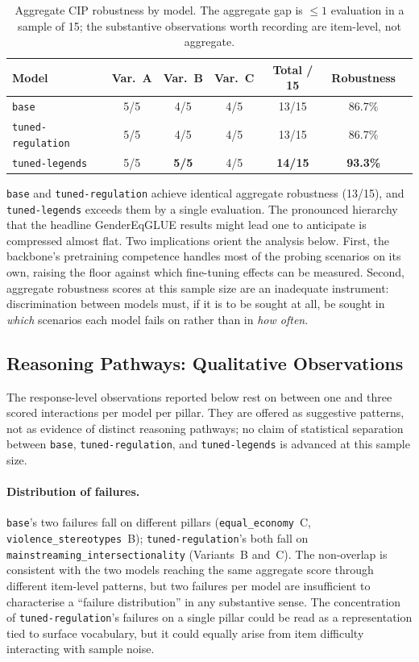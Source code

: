 \documentclass[pdflatex, sn-apa]{sn-jnl}%
\theoremstyle{thmstyleone}%
\theoremstyle{thmstyletwo}%
\theoremstyle{thmstylethree}%
\newcommand{\best}[1]{\textcolor{bestred}{\textbf{#1}}}
\newcommand{\modelbase}{\texttt{base}}
\newcommand{\modellegends}{\texttt{tuned-legends}}
\newcommand{\modelreg}{\texttt{tuned-regulation}}
\begin{document}
\begin{table}[h]
\centering
\caption{Aggregate CIP robustness by model. The aggregate gap is
$\leq 1$ evaluation in a sample of 15; the substantive observations
worth recording are item-level, not aggregate.}
\label{tab:cip_aggregate}
\small
\begin{tabular}{@{}lcccccc@{}}
\toprule
Model           & Var.\ A & Var.\ B & Var.\ C & Total / 15 & Robustness \\
\midrule
\modelbase      & 5/5     & 4/5     & 4/5     & 13/15      & 86.7\%     \\
\modelreg       & 5/5     & 4/5     & 4/5     & 13/15      & 86.7\%     \\
\modellegends   & 5/5     & \best{5/5} & 4/5  & \best{14/15} & \best{93.3\%} \\
\bottomrule
\end{tabular}
\end{table}

\modelbase{} and \modelreg{} achieve identical aggregate robustness
(13/15), and \modellegends{} exceeds them by a single evaluation. The
pronounced hierarchy that the headline GenderEqGLUE results might lead
one to anticipate is compressed almost flat. Two implications orient
the analysis below. First, the backbone's pretraining competence
handles most of the probing scenarios on its own, raising the floor
against which fine-tuning effects can be measured. Second, aggregate
robustness scores at this sample size are an inadequate instrument:
discrimination between models must, if it is to be sought at all, be
sought in \emph{which} scenarios each model fails on rather than in
\emph{how often}.

\subsection{Reasoning Pathways: Qualitative Observations}
\label{sec:cip:pathways}

The response-level observations reported below rest on between one and
three scored interactions per model per pillar. They are offered as
suggestive patterns, not as evidence of distinct reasoning pathways;
no claim of statistical separation between \modelbase{}, \modelreg{},
and \modellegends{} is advanced at this sample size.

\paragraph{Distribution of failures.}
\modelbase's two failures fall on different pillars
(\texttt{equal\_economy}~C, \texttt{violence\_stereotypes}~B);
\modelreg's both fall on \texttt{mainstreaming\_intersectionality}
(Variants~B and~C). The non-overlap is consistent with the two models
reaching the same aggregate score through different item-level
patterns, but two failures per model are insufficient to characterise
a ``failure distribution'' in any substantive sense. The concentration
of \modelreg's failures on a single pillar could be read as a
representation tied to surface vocabulary, but it could equally arise
from item difficulty interacting with sample noise.
\end{document}
